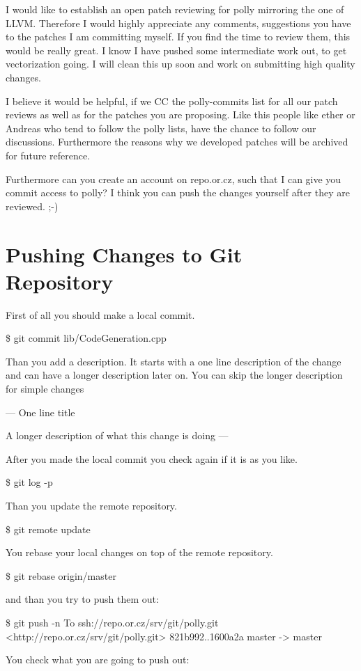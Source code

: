 \documentclass[a4paper,10pt]{article}
\begin{document}
   I would like to establish an open patch reviewing for polly mirroring the one of LLVM. Therefore I would highly appreciate any comments, suggestions you have to the patches I am committing myself. If you find the time to review them, this would be really great. I know I have pushed some intermediate work out, to get vectorization going. I will clean this up soon and work on submitting high quality changes.

   I believe it would be helpful, if we CC the polly-commits list for all our patch reviews as well as for the patches you are proposing. Like this people like ether or Andreas who tend to follow the polly lists, have the chance to follow our discussions. Furthermore the reasons why we developed patches will be archived for future reference.

   Furthermore can you create an account on repo.or.cz, such that I can give you commit access to polly? I think you can push the changes yourself after they are reviewed. ;-)

\section{Pushing Changes to Git Repository}
   First of all you should make a local commit.

   \$ git commit lib/CodeGeneration.cpp

   Than you add a description. It starts with a one line description of the change and can have a longer description later on. You can skip the longer description for simple changes

   ---
   One line title

   A longer description of what this change is doing
   ---

   After you made the local commit you check again if it is as you like.

   \$ git log -p

   Than you update the remote repository.

   \$ git remote update

   You rebase your local changes on top of the remote repository.

   \$ git rebase origin/master

   and than you try to push them out:


   \$ git push -n
   To ssh://repo.or.cz/srv/git/polly.git
   <http://repo.or.cz/srv/git/polly.git>
   821b992..1600a2a  master -> master

   You check what you are going to push out:
\end{document}
